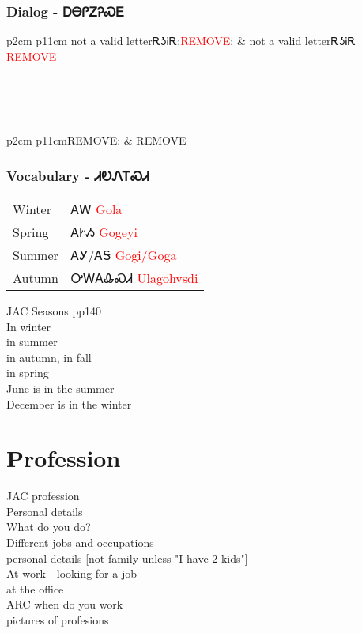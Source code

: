 \newpage\subsection{Dialog - ᎠᎾᎵᏃᎮᏍᎬ}
\begin{tabular}{p{2cm} p{11cm}}
not a valid letterᎡᎼᎥᎡ:\newline \textcolor{red}{REMOVE}: & not a valid letterᎡᎼᎥᎡ 
\newline\textcolor{red}{REMOVE}\\
\end{tabular}
\\
\\
\\
\noindent\begin{tabular}{p{2cm} p{11cm}}REMOVE: & REMOVE\\
\end{tabular}
\vfill\newpage\subsection{Vocabulary - ᏗᎧᏁᎢᏍᏗ 
}
\begin{minipage}{\linewidth}
\begin{tabular}{p{3cm} p{11cm}}
Winter & ᎪᎳ 
 \newline \textcolor{red}{Gola}\\
Spring & ᎪᎨᏱ 
 \newline \textcolor{red}{Gogeyi}\\
Summer & ᎪᎩ/ᎪᎦ 
 \newline \textcolor{red}{Gogi/Goga}\\
Autumn & ᎤᎳᎪᎲᏍᏗ 
 \newline \textcolor{red}{Ulagohvsdi}\\
\end{tabular}
\end{minipage}

\cite{walcpp49}\noindent JAC Seasons pp140\\
In winter\\
in summer\\
in autumn, in fall\\
in spring\\
June is in the summer\\
December is in the winter\\
\chapter{Profession}
JAC profession\\
Personal details\\
What do you do?\\
Different jobs and occupations\\
personal details [not family unless "I have 2 kids"]\\
At work - looking for a job\\
at the office\\
ARC when do you work\\
pictures of profesions\\
